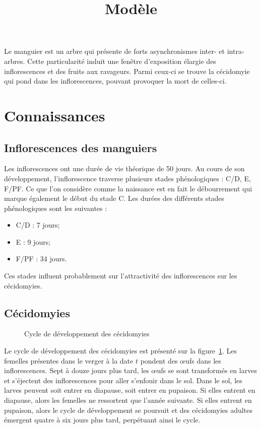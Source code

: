 \documentclass[a4paper, 11pt]{article}
\title{Modèle}
\author{}
\date{}
\begin{document}
\maketitle  

Le manguier est un arbre qui présente de forts asynchronismes inter- et intra-arbres. Cette particularité induit une fenêtre d'exposition élargie des inflorescences et des fruits aux ravageurs. Parmi ceux-ci se trouve la cécidomyie qui pond dans les inflorescences, pouvant provoquer la mort de celles-ci.

\section{Connaissances}

\subsection{Inflorescences des manguiers}

Les inflorescences ont une durée de vie théorique de 50 jours. Au cours de son développement, l'inflorescence traverse plusieurs stades phénologiques : C/D, E, F/PF. Ce que l'on considère comme la naissance est en fait le débourrement qui marque également le début du stade C. Les durées des différents stades phénologiques sont les suivantes :
\begin{itemize}
 \item C/D : 7 jours;
 \item E : 9 jours;
 \item F/PF : 34 jours.
\end{itemize}
Ces stades influent probablement sur l'attractivité des inflorescences sur les cécidomyies.

\subsection{Cécidomyies}

\begin{figure}[ht]
 \centering
 \caption{Cycle de développement des cécidomyies}
 \label{fig:cycle}
\end{figure}

Le cycle de développement des cécidomyies est présenté sur la figure~\ref{fig:cycle}. Les femelles présentes dans le verger à la date $t$ pondent des œufs dans les inflorescences. Sept à douze jours plus tard, les œufs se sont transformés en larves et s'éjectent des inflorescences pour aller s'enfouir dans le sol. Dans le sol, les larves peuvent soit entrer en diapause, soit entrer en pupaison. Si elles entrent en diapause, alors les femelles ne ressortent que l'année suivante. Si elles entrent en pupaison, alors le cycle de développement se poursuit et des cécidomyies adultes émergent quatre à six jours plus tard, perpétuant ainsi le cycle.
\end{document}
